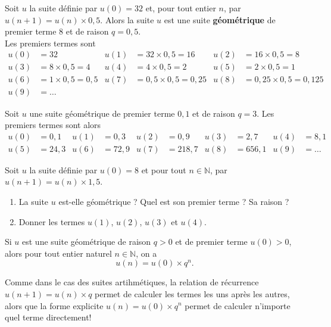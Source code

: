 \documentclass[11pt]{article}
\begin{document}
\begin{exemple}
  Soit $u$ la suite définie par $u(0)=32$ et, pour tout entier $n$, par
  $u(n+1)=u(n)\times0,5$. Alors la suite $u$ est une suite \textbf{géométrique}
  de premier terme $8$ et de raison $q=0,5$.\\
  Les premiers termes sont
  \begin{align*}
    u(0) &= 32 &
    u(1) &= 32\times0,5=16 &
    u(2) &= 16\times0,5=8 \\
    u(3) &= 8\times0,5=4 &
    u(4) &= 4\times0,5=2 &
    u(5) &= 2\times0,5=1 \\
    u(6) &= 1\times0,5=0,5 &
    u(7) &= 0,5\times0,5=0,25 &
    u(8) &= 0,25\times0,5=0,125 \\
    u(9) &= \dots & & & &
  \end{align*}
\end{exemple}
\begin{exemple}
  Soit $u$ une suite géométrique de premier terme $0,1$ et de raison $q=3$. Les
  premiers termes sont alors
  \begin{align*}
    u(0) &= 0,1 &
    u(1) &= 0,3 &
    u(2) &= 0,9 &
    u(3) &= 2,7 &
    u(4) &= 8,1 \\
    u(5) &= 24,3 &
    u(6) &= 72,9 &
    u(7) &= 218,7 &
    u(8) &= 656,1 &
    u(9) &= \dots
  \end{align*}
\end{exemple}
\begin{app}
  Soit $u$ la suite définie par $u(0)=8$ et pour tout $n\in\mathbb{N}$, par
  $u(n+1)=u(n)\times1,5$.
  \begin{enumerate}
    \item La suite $u$ est-elle géométrique ? Quel est son premier terme ? Sa
      raison ?
    \item Donner les termes $u(1)$, $u(2)$, $u(3)$ et $u(4)$.
  \end{enumerate}
\end{app}
\begin{prop}
  Si $u$ est une suite géométrique de raison $q>0$ et de premier terme
  $u(0)>0$, alors pour tout entier naturel $n\in\mathbb{N}$, on a
  \[
    u(n) = u(0)\times q^n.
  \]
\end{prop}

\begin{rmq}
  Comme dans le cas des suites artihmétiques, la relation de récurrence
  $u(n+1)=u(n)\times q$ permet de calculer les termes les uns après les autres,
  alors que la forme explicite $u(n)=u(0)\times q^n$ permet de calculer
  n'importe quel terme directement!
\end{rmq}
\end{document}
